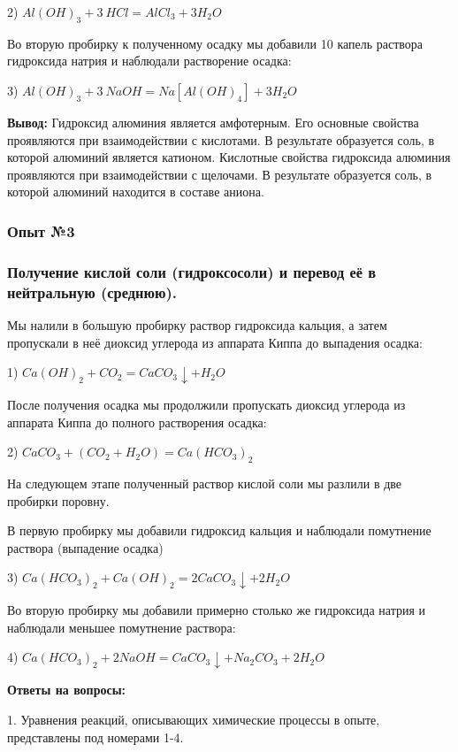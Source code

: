 \documentclass[12pt, a4paper]{article}
\begin{document}
	2) $Al(OH)_{3} + 3\ HCl = AlCl_{3} + 3H_{2}O$ 
	
	Во вторую пробирку к полученному осадку мы добавили 10 капель раствора гидроксида натрия и наблюдали растворение осадка:
	
	3) $Al(OH)_{3} + 3\ NaOH = Na[Al(OH)_{4}] + 3H_{2}O$ 
	
	\textbf{Вывод:} Гидроксид алюминия является амфотерным. Его основные свойства проявляются при взаимодействии с кислотами. В результате образуется соль, в которой алюминий является катионом. Кислотные свойства гидроксида алюминия проявляются при взаимодействии с щелочами. В результате образуется соль, в которой алюминий находится в составе аниона.
	
	\subsubsection*{Опыт №3}
	\subsubsection*{Получение кислой соли (гидроксосоли) и перевод её в нейтральную (среднюю).}
	
	Мы налили в большую пробирку раствор гидроксида кальция, а затем пропускали в неё диоксид углерода из аппарата Киппа до выпадения осадка:
	
	1) $Ca(OH)_{2} + CO_{2} = CaCO_{3} \downarrow + H_{2}O$ 
		
	После получения осадка мы продолжили пропускать диоксид углерода из аппарата Киппа до полного растворения осадка:
	
	2) $CaCO_{3} + (CO_{2} + H_{2}O) = Ca(HCO_{3})_{2}$ 
	
	На следующем этапе полученный раствор кислой соли мы разлили в две пробирки поровну.
	
	В первую пробирку мы добавили гидроксид кальция и наблюдали помутнение раствора (выпадение осадка)
	
	3) $Ca(HCO_{3})_{2} + Ca(OH)_{2} = 2CaCO_{3} \downarrow + 2H_{2}O$
	
	Во вторую пробирку мы добавили примерно столько же гидроксида натрия и наблюдали меньшее помутнение раствора:
	
	4) $Ca(HCO_{3})_{2} + 2NaOH = CaCO_{3} \downarrow + Na_{2}CO_{3} + 2H_{2}O$
	
	\textbf{Ответы на вопросы:}
	
	1. Уравнения реакций, описывающих химические процессы в опыте, представлены под номерами 1-4.
	
\end{document}
